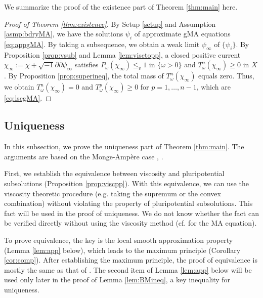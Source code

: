 \documentclass[10pt,a4paper]{amsart}
\numberwithin{equation}{section}
\newcommand{\delb}{\sqrt{-1}\partial\bar{\partial}}
\begin{document}
We summarize the proof of the existence part of Theorem \ref{thm:main} here.

\begin{proof}[Proof of Theorem \ref{thm:existence}]
    By Setup \ref{setup} and Assumption \ref{asmp:bdryMA}, we have the solutions $\psi_i$ of approximate gMA equations \eqref{eq:appgMA}. By taking a subsequence, we obtain a weak limit $\psi_\infty$ of $\{\psi_i\}$. By Proposition \ref{prop:vsub} and Lemma \ref{lem:visctopp}, a closed positive current $\chi_\infty:=\chi+\delb\psi_\infty$ satisfies $P_\omega(\chi_\infty)\le_v1$ in $\{\omega>0\}$ and $T^n_{\omega}(\chi_\infty)\ge0$ in $X$. 
    By Proposition \ref{prop:superineq}, the total mass of $T^n_\omega(\chi_\infty)$ equals zero. Thus, we obtain $T^n_\omega(\chi_\infty)=0$ and $T^p_\omega(\chi_\infty)\ge0$ for $p=1,\dots, n-1$, which are \eqref{eq:lscgMA}. 
\end{proof}

\subsection{Uniqueness}\label{subsec:uniqueness}

In this subsection, we prove the uniqueness part of Theorem \ref{thm:main}. The arguments are based on the Monge-Ampère case \cite[Section 3]{BEGZ}, \cite{Dinew}.

First, we establish the equivalence between viscosity and pluripotential subsolutions (Proposition \ref{prop:viscpp}). With this equivalence, we can use the viscosity theoretic procedure (e.g. taking the supremum or the convex combination) without violating the property of pluripotential subsolutions. This fact will be used in the proof of uniqueness. We do not know whether the fact can be verified directly without using the viscosity method (cf. \cite[Corollary 1.10]{GZ} for the MA equation). 

To prove equivalence, the key is the local smooth approximation property (Lemma \ref{lem:app} below), which leads to the maximum principle (Corollary \ref{cor:comp}). After establishing the maximum principle,  the proof of equivalence is mostly the same as that of \cite[Propositions 1.5 and 1.11]{EGZ}.
The second item of Lemma \ref{lem:app} below will be used only later in the proof of Lemma \ref{lem:BMineq}, a key inequality for uniqueness.
\end{document}
